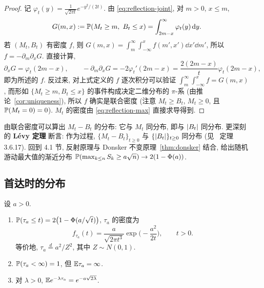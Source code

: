 \begin{proof}
记 $\varphi_t(y)=\frac{1}{\sqrt{2\pi t}}e^{-y^2/(2t)}$. 由 \eqref{eq:reflection-joint}, 对 $m>0$, $x\le m$,
\[
G(m,x):=\P(M_t\ge m,\ B_t\le x)=\int_{2m-x}^\infty\varphi_t(y)\dd y.
\]
若 $(M_t,B_t)$ 有密度 $f$, 则 $G(m,x)=\int_m^\infty\int_{-\infty}^xf(m',x')\dd x'\dd m'$, 所以 $f=-\partial_m\partial_xG$. 直接计算,
\[
\partial_xG=\varphi_t(2m-x),\qquad -\partial_m\partial_xG=-2\varphi_t'(2m-x)=\frac{2(2m-x)}{t}\varphi_t(2m-x),
\]
即为所述的 $f$. 反过来, 对上式定义的 $f$ 逐次积分可以验证 $\int_m^\infty\int_{-\infty}^xf=G(m,x)$, 而形如 $\{M_t\ge m,B_t\le x\}$ 的事件构成决定二维分布的 $\pi$-系 (由推论~\ref{cor:uniqueness}), 所以 $f$ 确实是联合密度 (注意 $M_t\ge B_t$, $M_t\ge0$, 且 $\P(M_t=0)=0$). $M_t$ 的密度由 \eqref{eq:reflection-max} 直接求导得到.
\end{proof}

\begin{remark}
由联合密度可以算出 $M_t-B_t$ 的分布: 它与 $M_t$ 同分布, 即与 $\abs{B_t}$ 同分布. 更深刻的 \textbf{L\'evy 定理} 断言: 作为过程, $\{M_t-B_t\}_{t\ge0}$ 与 $\{\abs{B_t}\}_{t\ge0}$ 同分布 (见~\cite{karatzas} 定理 3.6.17). 回到 4.1 节, 反射原理与 Donsker 不变原理~\ref{thm:donsker} 结合, 给出随机游动最大值的渐近分布 $\P(\max_{k\le n}S_k\ge a\sqrt{n})\to2(1-\Phi(a))$.
\end{remark}

\subsection{首达时的分布}

\begin{theorem}[首达时]\label{thm:hitting-time}
设 $a>0$.
\begin{enumerate}
\item $\P(\tau_a\le t)=2\big(1-\Phi(a/\sqrt{t})\big)$, $\tau_a$ 的密度为
\[
f_{\tau_a}(t)=\frac{a}{\sqrt{2\pi t^3}}\exp\Big(-\frac{a^2}{2t}\Big),\qquad t>0.
\]
等价地, $\tau_a\overset{d}{=}a^2/Z^2$, 其中 $Z\sim N(0,1)$.
\item $\P(\tau_a<\infty)=1$, 但 $\E\tau_a=\infty$.
\item 对 $\lambda>0$, $\E e^{-\lambda\tau_a}=e^{-a\sqrt{2\lambda}}$.
\end{enumerate}
\end{theorem}

